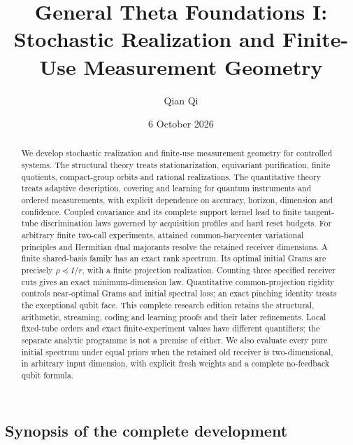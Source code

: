 \documentclass[11pt]{amsart}
\title[General Theta Foundations I]{General Theta Foundations I:\\Stochastic Realization and Finite-Use Measurement Geometry}
\author{Qian Qi}
\date{6 October 2026}
\numberwithin{equation}{section}
\theoremstyle{definition}\newtheorem{definition}[theorem]{Definition}
\theoremstyle{remark}\newtheorem{remark}[theorem]{Remark}
\begin{document}
\raggedbottom
\begin{abstract}
We develop stochastic realization and finite-use measurement geometry
for controlled systems.  The structural theory treats stationarization,
equivariant purification, finite quotients, compact-group orbits and
rational realizations.  The quantitative theory treats adaptive
description, covering and learning for quantum instruments and ordered
measurements, with explicit dependence on accuracy, horizon, dimension
and confidence.  Coupled covariance and its complete support kernel
lead to finite tangent-tube discrimination laws governed by acquisition
profiles and hard reset budgets.  For arbitrary finite two-call
experiments, attained common-barycenter variational principles and
Hermitian dual majorants resolve the retained receiver dimensions.
A finite shared-basis family has an exact rank spectrum.  Its optimal
initial Grams are precisely $\rho\preceq I/r$, with a finite projection
realization.  Counting three specified receiver cuts gives an exact
minimum-dimension law.  Quantitative common-projection rigidity controls
near-optimal Grams and initial spectral loss; an exact pinching identity
treats the exceptional qubit face.  This complete research edition
retains the structural, arithmetic, streaming, coding and learning
proofs and their later refinements.  Local fixed-tube orders and exact
finite-experiment values have different quantifiers; the separate
analytic programme is not a premise of either.
We also evaluate every pure initial spectrum under equal priors when
the retained old receiver is two-dimensional, in arbitrary input dimension,
with explicit fresh weights and a complete no-feedback qubit formula.
\end{abstract}
\maketitle
\subsection*{Synopsis of the complete development}
\end{document}
